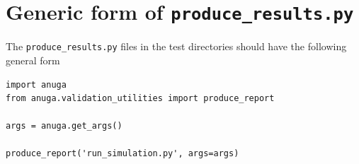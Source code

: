 \pagebreak
\section{Generic form of \texttt{produce\_results.py}}

The \texttt{produce\_results.py} files in the test directories should have the
following general form

\begin{verbatim}
import anuga
from anuga.validation_utilities import produce_report

args = anuga.get_args()

produce_report('run_simulation.py', args=args)
\end{verbatim}
